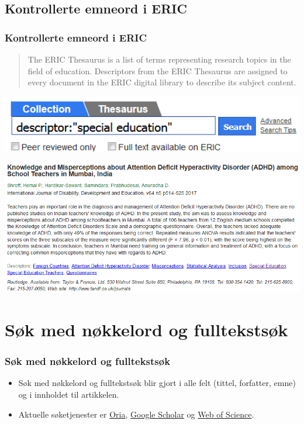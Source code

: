 \documentclass{beamer}
\begin{document}
\subsection{Kontrollerte emneord i ERIC}
\begin{frame}
  \frametitle{Kontrollerte emneord i ERIC}
  \begin{quote}
    The ERIC Thesaurus is a list of terms representing research topics in the field of education. Descriptors from the ERIC Thesaurus are \alert{assigned to every document} in the ERIC digital library to describe its subject content.
  \end{quote}
\end{frame}
\begin{frame}
  \centering
  \includegraphics[width=1\textwidth]{../media/eric-descriptor.png}
\end{frame}
\begin{frame}
  \centering
  \includegraphics[width=1\textwidth]{../media/eric-descriptor-2.png}
\end{frame}

\section{Søk med nøkkelord og fulltekstsøk}
\begin{frame}
  \frametitle{Søk med nøkkelord og fulltekstsøk}
  \begin{itemize}
  \item Søk med nøkkelord og fulltekstsøk blir gjort i \alert{alle felt} (tittel, forfatter, emne) og i \alert{innholdet} til artikkelen.
  \item Aktuelle søketjenester er \href{http://bibsys-almaprimo.hosted.exlibrisgroup.com/primo_library/libweb/action/search.do?vid=DMMH}{Oria}, \href{https://scholar.google.com}{Google Scholar} og \href{http://apps.webofknowledge.com}{Web of Science}.
  \end{itemize}
\end{frame}
\end{document}
